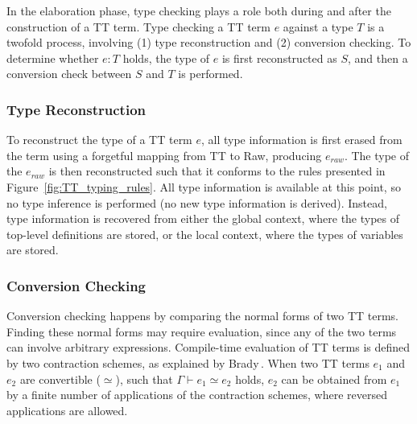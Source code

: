 In the elaboration phase, type checking plays a role both during and after the
construction of a TT term. Type checking a TT term $e$ against a type $T$ is a
twofold process, involving (1) type reconstruction and (2) conversion
checking. To determine whether $e : T$ holds, the type of $e$ is first
reconstructed as $S$, and then a conversion check between $S$ and $T$ is performed.

\subsubsection{Type Reconstruction}
To reconstruct the type of a TT term $e$, all type information is first erased from
the term using a forgetful mapping from TT to Raw, producing $e_{raw}$. The type of the $e_{raw}$ is
then reconstructed such that it conforms to the rules presented in
Figure~\ref{fig:TT_typing_rules}. All type information is available at this
point, so no type inference is performed (no new type information is
derived). Instead, type information is recovered from either the global context,
where the types of top-level definitions are stored, or the local context, where
the types of variables are stored.

\subsubsection{Conversion Checking}
Conversion checking happens by comparing the normal forms of two TT
terms. Finding these normal forms may require evaluation, since any of the two
terms can involve arbitrary expressions. Compile-time evaluation of TT terms is
defined by two contraction schemes, as explained by Brady\,\citep{BradyIdrisImpl13}.
When two TT terms $e_{1}$ and $e_{2}$ are convertible ($\simeq$), such that
$\Gamma\vdash e_{1} \simeq e_{2}$ holds, $e_{2}$ can be
obtained from $e_{1}$ by a finite number of applications of the contraction
schemes, where reversed applications are allowed.


